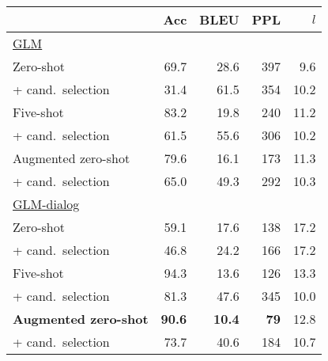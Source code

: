 \begin{table}
\begin{subtable}{.58\linewidth}
\begin{tabular}{l r r r r}
        \bottomrule
        \end{tabular}
        \label{tab:prior-methods}
        \caption{}
    \end{subtable}
    \begin{subtable}{.40\linewidth}
    \centering \small 
        \begin{tabular}{l r r r r}
        \toprule
         & Acc & BLEU & PPL & $l$\\
        \midrule
        \underline{GLM} \\
        Zero-shot & 69.7 & 28.6 & 397 & 9.6 \\
        + cand.~selection & 31.4 & 61.5 & 354 & 10.2 \\
        Five-shot & 83.2 & 19.8 & 240 & 11.2 \\
        + cand.~selection & 61.5 & 55.6 & 306 & 10.2 \\
        Augmented zero-shot & 79.6 & 16.1 & 173 & 11.3 \\
        + cand.~selection & 65.0 & 49.3 & 292 & 10.3 \\
        \midrule
        \underline{GLM-dialog} \\
        Zero-shot & 59.1 & 17.6 & 138 & 17.2 \\
        + cand.~selection & 46.8 & 24.2 & 166 & 17.2  \\
        Five-shot & 94.3 & 13.6 & 126 & 13.3 \\
        + cand.~selection & 81.3 & 47.6 & 345 & 10.0 \\
        \textbf{Augmented zero-shot} & \textbf{90.6} & \textbf{10.4} & \textbf{79} & 12.8 \\
        + cand.~selection & 73.7 & 40.6 & 184 & 10.7 \\
        \bottomrule
        \end{tabular}
        \caption{}
        \label{tab:ablation}
    \end{subtable}
\end{table}
